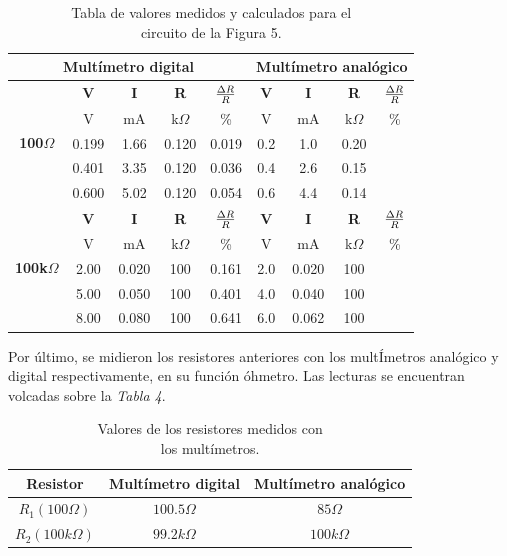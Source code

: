 \documentclass{article}
\begin{document}
\begin{table}[!hbt]
	\begin{center}

		\begin{tabular}{|c|c|c|c|c|c|c|c|c|} \hline
			\multicolumn{5}{|c|}{\textbf{Multímetro digital}} & \multicolumn{4}{|c|}{\textbf{Multímetro analógico}} \\ \hline
			\multirow{5}{*}{\textbf{100$\Omega$}} 
			& \textbf{V} & \textbf{I} & \textbf{R} & \textbf{${\Delta R \over R}$} & \textbf{V} & \textbf{I} & \textbf{R} & \textbf{${\Delta R \over R}$} \\\cline{2-9}
			& V & mA & k$\Omega$ & \% & V & mA & k$\Omega$ & \% \\\cline{2-9}
			& 0.199 & 1.66 & 0.120 & 0.019 & 0.2 & 1.0 & 0.20 &  \\\cline{2-9}
			& 0.401 & 3.35 & 0.120 & 0.036 & 0.4 & 2.6 & 0.15 &  \\\cline{2-9}
			& 0.600 & 5.02 & 0.120 & 0.054 & 0.6 & 4.4 & 0.14 &  \\ \hline
			\multirow{5}{*}{\textbf{100k$\Omega$}} 
			& \textbf{V} & \textbf{I} & \textbf{R} & \textbf{${\Delta R \over R}$} & \textbf{V} & \textbf{I} & \textbf{R} & \textbf{${\Delta R \over R}$} \\\cline{2-9}
			& V & mA & k$\Omega$ & \% & V & mA & k$\Omega$ & \% \\\cline{2-9}
			& 2.00 & 0.020 & 100 & 0.161 & 2.0 & 0.020 & 100 &  \\\cline{2-9}
			& 5.00 & 0.050 & 100 & 0.401 & 4.0 & 0.040 & 100 &  \\\cline{2-9}
			& 8.00 & 0.080 & 100 & 0.641 & 6.0 & 0.062 & 100 &  \\ \hline
		\end{tabular}

	\caption{Tabla de valores medidos y calculados para el\\ circuito de la Figura 5.}
	\end{center}
\end{table}
\bigskip




	Por último, se midieron los resistores anteriores con los multÍmetros analógico y digital respectivamente, en su función óhmetro. Las lecturas se encuentran volcadas sobre la \textit{Tabla 4}.
\bigskip\bigskip


\begin{table}[!hbt]
	\begin{center}
	\begin{tabular}{|c|c|c|}
		\hline
		\textbf{Resistor} & \textbf{Multímetro digital} & \textbf{Multímetro analógico} \\
		\hline
		$R_1 (100\Omega)$ & $100.5\Omega$ & $85\Omega$ \\
		\hline
		$R_2 (100k\Omega)$ & $99.2k\Omega$ & $100k\Omega$ \\
		\hline
	\end{tabular}
	\caption{Valores de los resistores medidos con\\ los multímetros.}
	\end{center}
\end{table}
\end{document}
